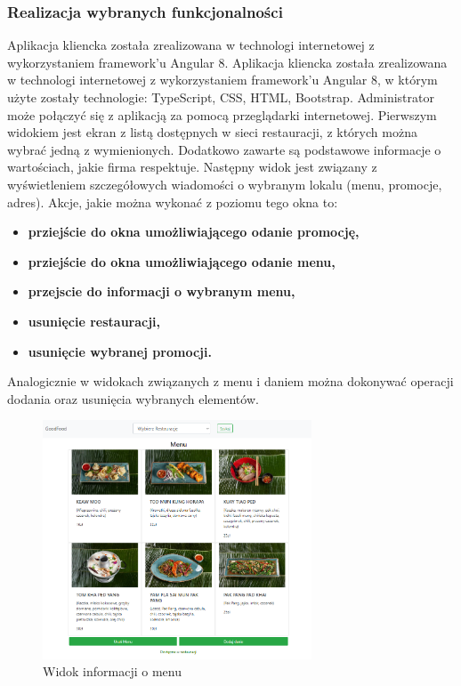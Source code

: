 \documentclass{article}
\begin{document}
		\subsubsection{Realizacja wybranych funkcjonalności}
		Aplikacja kliencka została zrealizowana w technologi internetowej z wykorzystaniem framework'u Angular 8.
		Aplikacja kliencka została zrealizowana w technologi internetowej z wykorzystaniem framework'u Angular 8, w którym użyte zostały technologie:  TypeScript, CSS, HTML, Bootstrap. Administrator może połączyć się z aplikacją za pomocą przeglądarki internetowej. Pierwszym widokiem jest ekran z listą dostępnych w sieci restauracji, z których można wybrać jedną z wymienionych. Dodatkowo zawarte są podstawowe informacje o wartościach, jakie firma respektuje. Następny widok jest związany z wyświetleniem szczegółowych wiadomości o wybranym lokalu (menu, promocje, adres). Akcje, jakie można wykonać z poziomu tego okna to:
		\begin{itemize}
				\item
					\textbf{prziejście do okna umożliwiającego odanie promocję,} 
				\item
					\textbf{prziejście do okna umożliwiającego odanie menu,}
				\item
					\textbf{przejscie do informacji o wybranym menu,}
				\item
					\textbf{usunięcie restauracji,}
				\item
					\textbf{usunięcie wybranej promocji.}
			\end{itemize}
			Analogicznie w widokach związanych z menu i daniem można dokonywać operacji  dodania oraz usunięcia wybranych elementów.

			\begin{figure}[hbt!]
				\includegraphics[width=8cm]{Files/Pictures/MenuList_A}
				\centering
				\caption{Widok informacji o menu}
			\end{figure}
\end{document}
